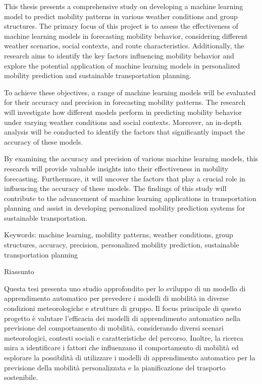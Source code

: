%
\label{sec:abstract}

This thesis presents a comprehensive study on developing a machine learning model to predict mobility patterns in various weather conditions and group structures. The primary focus of this project is to assess the effectiveness of machine learning models in forecasting mobility behavior, considering different weather scenarios, social contexts, and route characteristics. Additionally, the research aims to identify the key factors influencing mobility behavior and explore the potential application of machine learning models in personalized mobility prediction and sustainable transportation planning.

To achieve these objectives, a range of machine learning models will be evaluated for their accuracy and precision in forecasting mobility patterns. The research will investigate how different models perform in predicting mobility behavior under varying weather conditions and social contexts. Moreover, an in-depth analysis will be conducted to identify the factors that significantly impact the accuracy of these models.

By examining the accuracy and precision of various machine learning models, this research will provide valuable insights into their effectiveness in mobility forecasting. Furthermore, it will uncover the factors that play a crucial role in influencing the accuracy of these models. The findings of this study will contribute to the advancement of machine learning applications in transportation planning and assist in developing personalized mobility prediction systems for sustainable transportation.

Keywords: machine learning, mobility patterns, weather conditions, group structures, accuracy, precision, personalized mobility prediction, sustainable transportation planning

\vspace*{20mm}

{Riassunto}
\label{sec:abstract-diff}

Questa tesi presenta uno studio approfondito per lo sviluppo di un modello di apprendimento automatico per prevedere i modelli di mobilità in diverse condizioni meteorologiche e strutture di gruppo. Il focus principale di questo progetto è valutare l'efficacia dei modelli di apprendimento automatico nella previsione del comportamento di mobilità, considerando diversi scenari meteorologici, contesti sociali e caratteristiche del percorso. Inoltre, la ricerca mira a identificare i fattori che influenzano il comportamento di mobilità ed esplorare la possibilità di utilizzare i modelli di apprendimento automatico per la previsione della mobilità personalizzata e la pianificazione del trasporto sostenibile.

